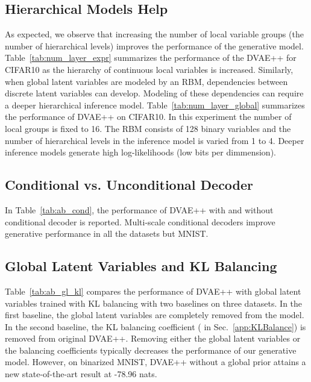 \documentclass{article}
\begin{document}
\subsection{Hierarchical Models Help}
As expected, we observe that increasing the number of local variable groups (the number of hierarchical levels) 
improves the performance of the generative model. 
Table~\ref{tab:num_layer_expr} summarizes the performance of the
DVAE++ for CIFAR10 as the hierarchy of continuous local variables is increased. 
Similarly, when global latent variables are modeled 
by an RBM, dependencies between discrete latent variables can develop. Modeling of these dependencies can 
require a deeper hierarchical inference model.
Table~\ref{tab:num_layer_global} summarizes the performance of
DVAE++ on CIFAR10. In this experiment the number of local groups is fixed to 16. The RBM consists of 128 binary variables and the number of hierarchical levels in the inference model is varied from 1 to 4. Deeper inference models generate high log-likelihoods (low bits per dimmension).

\subsection{Conditional vs. Unconditional Decoder}
In Table~\ref{tab:ab_cond}, the performance of DVAE++ with and without conditional decoder is reported. Multi-scale conditional decoders improve generative performance in all the datasets but MNIST.

\subsection{Global Latent Variables and KL Balancing}
Table~\ref{tab:ab_gl_kl} compares the performance of DVAE++ with 
global latent variables trained with KL balancing with two baselines on three datasets. 
In the first baseline, the global latent variables are completely removed from the model. 
In the second baseline, the KL balancing coefficient 
( in Sec.~\ref{app:KLBalance}) is removed from original DVAE++.
Removing either the global latent variables or the balancing coefficients typically decreases the
performance of our generative model. However, on binarized MNIST, DVAE++ without a global prior attains 
a new state-of-the-art result at -78.96 nats.
\end{document}
